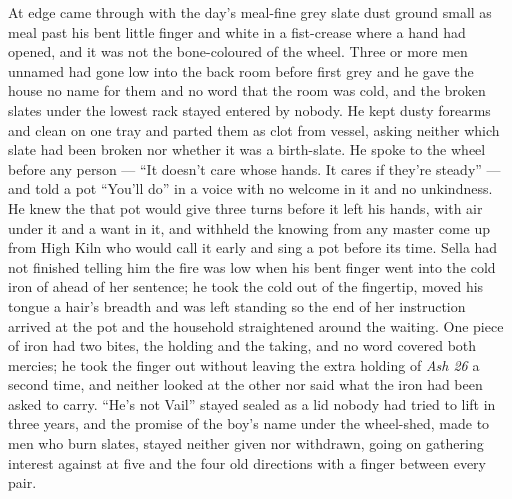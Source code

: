 At  edge  came through  with the day's meal-fine grey slate dust ground small as meal past his bent little finger and white in a fist-crease where a hand had opened, and it was not the bone-coloured  of the wheel. Three or more men unnamed had gone low into the back room before first grey and he gave the house no name for them and no word that the room was cold, and the broken slates under the lowest rack stayed entered by nobody. He kept dusty forearms and clean on one tray and parted them as clot from vessel, asking neither which slate had been broken nor whether it was a birth-slate. He spoke to the wheel before any person --- “It doesn't care whose hands. It cares if they're steady” --- and told a pot “You'll do” in a voice with no welcome in it and no unkindness. He knew the  that pot would give three turns before it left his hands, with air under it and a want in it, and withheld the knowing from any master come up from High Kiln who would call it early and sing a pot before its time. Sella had not finished telling him the fire was low when his bent finger went into the cold iron of  ahead of her sentence; he took the cold out of the fingertip, moved his tongue a hair's breadth and was left standing so the end of her instruction arrived at the pot and the household straightened around the waiting. One piece of iron had two bites, the holding and the taking, and no  word covered both mercies; he took the finger out without leaving the extra holding of \emph{Ash 26} a second time, and neither looked at the other nor said what the iron had been asked to carry. “He's not Vail” stayed sealed as a lid nobody had tried to lift in three years, and the promise of the boy's name under the wheel-shed, made to men who burn slates, stayed neither given nor withdrawn, going on gathering interest against  at five and the four old directions with a finger between every pair.

\scenebreak

